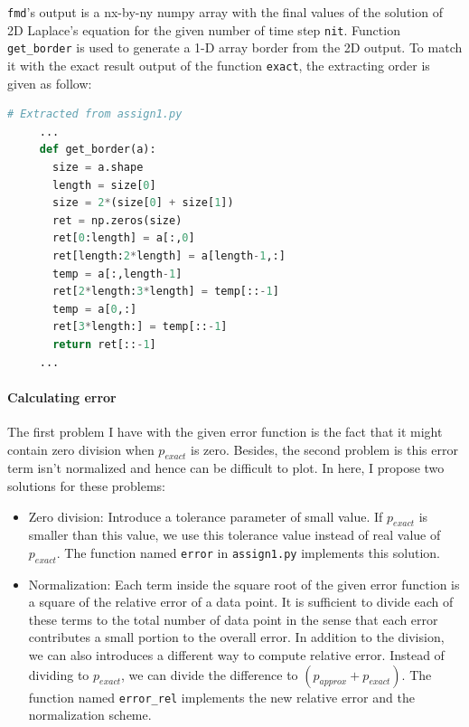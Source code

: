 \documentclass[a4paper,12pt]{article}
\begin{document}
\texttt{fmd}'s output is a nx-by-ny numpy array with the final values of the solution of 2D Laplace's equation for the given number of time step \texttt{nit}. Function \texttt{get\_border} is used to generate a 1-D array border from the 2D output. To match it with the exact result output of the function \texttt{exact}, the extracting order is given as follow:

\begin{lstlisting}[language=Python, caption={Get border solution from 2D FDM}, label={lst:border}]
     # Extracted from assign1.py
     ...
     def get_border(a):
       size = a.shape
       length = size[0]
       size = 2*(size[0] + size[1])
       ret = np.zeros(size)
       ret[0:length] = a[:,0]
       ret[length:2*length] = a[length-1,:]
       temp = a[:,length-1]
       ret[2*length:3*length] = temp[::-1]
       temp = a[0,:]
       ret[3*length:] = temp[::-1]
       return ret[::-1]
     ...
\end{lstlisting}

\paragraph{Calculating error} The first problem I have with the given error function is the fact that it might contain zero division when $p_{exact}$ is zero. Besides, the second problem is this error term isn't normalized and hence can be difficult to plot. In here, I propose two solutions for these problems:
\begin{itemize}
  \item Zero division: Introduce a tolerance parameter of small value. If $p_{exact}$ is smaller than this value, we use this tolerance value instead of real value of $p_{exact}$. The function named \texttt{error} in \texttt{assign1.py} implements this solution.
  \item Normalization: Each term inside the square root of the given error function is a square of the relative error of a data point. It is sufficient to divide each of these terms to the total number of data point in the sense that each error contributes a small portion to the overall error. In addition to the division, we can also introduces a different way to compute relative error. Instead of dividing to $p_{exact}$, we can divide the difference to $(p_{approx} + p_{exact})$. The function named \texttt{error\_rel} implements the new relative error and the normalization scheme.
\end{itemize}
\end{document}
